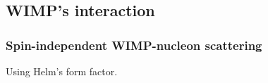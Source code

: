 \subsection{WIMP's interaction} \label{sec:wimp}

\subsubsection{Spin-independent WIMP-nucleon scattering}

Using Helm's form factor\cite{helm_inelastic_1956}.

\clearpage
